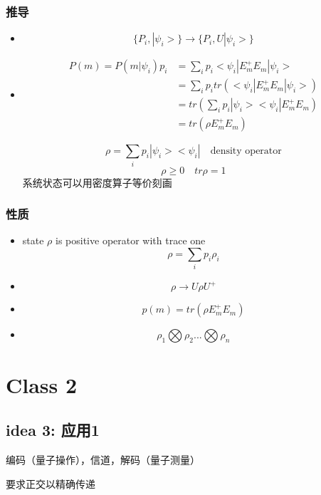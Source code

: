 \documentclass[a4paper, 11pt]{article} %
\begin{document}
\subsubsection{推导}
\begin{itemize}
	\item
	$$
	\lbrace P_i, |\psi_i>\rbrace \rightarrow \lbrace P_i , U|\psi_i> \rbrace
	$$
	\item
	\begin{align*}
	P(m) = P(m|\psi_i)p_i & = \sum_i p_i <\psi_i|E_m^+E_m|\psi_i>\\
	& = \sum_ip_itr(<\psi_i|E_m^+E_m|\psi_i>)\\
	& = tr(\sum_i p_i |\psi_i><\psi_i| E_m^+E_m)\\
	& = tr(\rho E_m^+E_m)
	\end{align*}

	$$
	 \rho = \sum_i p_i|\psi_i><\psi_i| \quad \mbox{density operator}
	$$
	$$
	\rho \geq 0 \quad tr\rho = 1 
	$$
	系统状态可以用密度算子等价刻画
\end{itemize}

\subsubsection{性质}
\begin{itemize}
\item
state $\rho$ is positive operator with trace one
$$
\rho = \sum_i p_i\rho_i
$$
\item
$$
\rho \rightarrow U\rho U^+
$$
\item
$$
p(m) = tr(\rho E_m^+E_m)
$$
\item 
$$
\rho_1 \bigotimes \rho_2 ... \bigotimes\rho_n
$$
\end{itemize}

\clearpage
\section{Class 2}
\subsection{idea 3: 应用1}
编码（量子操作），信道，解码（量子测量）

要求正交以精确传递
\end{document}
